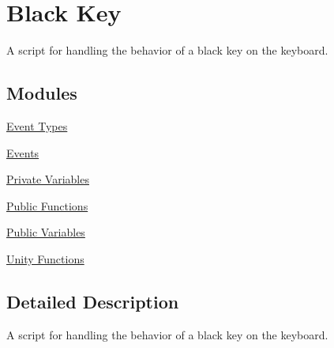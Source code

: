 \hypertarget{group___doc_black_key}{}\section{Black Key}
\label{group___doc_black_key}


A script for handling the behavior of a black key on the keyboard.  


\subsection*{Modules}
\begin{DoxyCompactItemize}
\item 
\hyperlink{group___black_key_event_types}{Event Types}
\item 
\hyperlink{group___black_key_events}{Events}
\item 
\hyperlink{group___black_key_priv_var}{Private Variables}
\item 
\hyperlink{group___black_key_pub_func}{Public Functions}
\item 
\hyperlink{group___black_key_pub_var}{Public Variables}
\item 
\hyperlink{group___black_key_unity}{Unity Functions}
\end{DoxyCompactItemize}


\subsection{Detailed Description}
A script for handling the behavior of a black key on the keyboard. 

